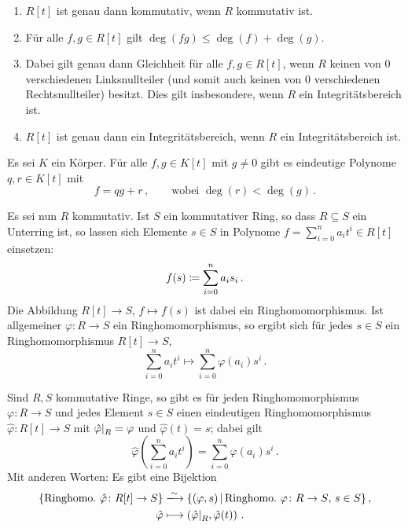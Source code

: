 \begin{proposition}
  \begin{enumerate}
    \item
      $R[t]$ ist genau dann kommutativ, wenn $R$ kommutativ ist.
    \item
      Für alle $f, g \in R[t]$ gilt $\deg(fg) \leq \deg(f) + \deg(g)$.
    \item
      Dabei gilt genau dann Gleichheit für alle $f, g \in R[t]$, wenn $R$ keinen von $0$ verschiedenen Linksnullteiler \textup(und somit auch keinen von $0$ verschiedenen Rechtsnullteiler\textup) besitzt.
      Dies gilt insbesondere, wenn $R$ ein Integritätsbereich ist.
    \item
      $R[t]$ ist genau dann ein Integritätsbereich, wenn $R$ ein Integritätsbereich ist.
  \end{enumerate}
\end{proposition}

\begin{proposition}[Polynomdivision]
  Es sei $K$ ein Körper.
  Für alle $f, g \in K[t]$ mit $g \neq 0$ gibt es eindeutige Polynome $q, r \in K[t]$ mit
  \[
    f = qg + r \,,
    \qquad
    \text{wobei $\deg(r) < \deg(g)$} \,.
  \]
\end{proposition}

Es sei nun $R$ kommutativ.
Ist $S$ ein kommutativer Ring, so dass $R \subseteq S$ ein Unterring ist, so lassen sich Elemente $s \in S$ in Polynome $f = \sum_{i=0}^n a_i t^i \in R[t]$ einsetzen:
\[
            f(s)
  \coloneqq  \sum_{i=0}^n a_i s_i \,.
\]
Die Abbildung $R[t] \to S$, $f \mapsto f(s)$ ist dabei ein Ringhomomorphismus.
Ist allgemeiner $\varphi \colon R \to S$ ein Ringhomomorphismus, so ergibt sich für jedes $s \in S$ ein Ringhomomorphismus $R[t] \to S$,
\[
          \sum_{i=0}^n a_i t^i
  \mapsto \sum_{i=0}^n \varphi(a_i) s^i \,.
\]

\begin{theorem}
  Sind $R, S$ kommutative Ringe, so gibt es für jeden Ringhomomorphismus $\varphi \colon R \to S$ und jedes Element $s \in S$ einen eindeutigen Ringhomomorphismus $\hat{\varphi} \colon R[t] \to S$ mit $\restrict{\hat{\varphi}}{R} = \varphi$ und $\hat{\varphi}(t) = s$;
  dabei gilt
  \[
      \hat{\varphi}\left( \sum_{i=0}^n a_i t^i \right)
    = \sum_{i=0}^n \varphi(a_i) s^i \,.
  \]
  Mit anderen Worten:
  Es gibt eine Bijektion
  \begin{align*}
                            \{ \text{Ringhomo.\ $\hat{\varphi} \colon R[t] \to S$} \}
    &\xlongrightarrow{\sim} \{
                              (\varphi, s)
                            \suchthat
                                \text{Ringhomo.\ $\varphi \colon R \to S$, $s \in S$}
                            \} \,,  \\
                            \hat{\varphi}
    &\longmapsto            \left( \restrict{\hat{\varphi}}{R}, \hat{\varphi}(t) \right) \,.
  \end{align*}
\end{theorem}



